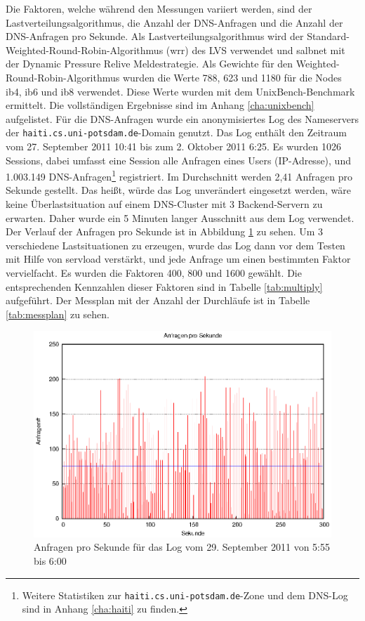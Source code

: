 \documentclass[a4paper, 12pt, BCOR10mm, DIV12, toc=bibliography, toc=listof, german]{scrbook}
\begin{document}
			Die Faktoren, welche während den Messungen variiert werden, sind der
			Lastverteilungsalgorithmus, die Anzahl der DNS-Anfragen und die Anzahl der DNS-Anfragen pro
			Sekunde. Als Lastverteilungsalgorithmus wird der Standard-Weighted-Round-Robin-Algorithmus
			(wrr) des LVS verwendet und salbnet mit der Dynamic Pressure Relive Meldestrategie. Als Gewichte
			für den Weighted-Round-Robin-Algorithmus wurden die Werte 788, 623 und 1180 für die Nodes ib4,
			ib6 und ib8 verwendet. Diese Werte wurden mit dem UnixBench-Benchmark \cite{unixbench}
			ermittelt. Die vollständigen Ergebnisse sind im Anhang \ref{cha:unixbench} aufgelistet. Für
			die DNS-Anfragen wurde ein anonymisiertes Log des Nameservers der
			\texttt{haiti.cs.uni-potsdam.de}-Domain genutzt. Das Log enthält den Zeitraum vom 27.
			September 2011 10:41 bis zum 2. Oktober 2011 6:25. Es wurden 1026 Sessions, dabei umfasst eine
			Session alle Anfragen eines Users (IP-Adresse), und 1.003.149 DNS-Anfragen\footnote{Weitere
			Statistiken zur \texttt{haiti.cs.uni-potsdam.de}-Zone und dem DNS-Log sind in Anhang
			\ref{cha:haiti} zu finden.} registriert. Im Durchschnitt werden 2,41 Anfragen pro Sekunde
			gestellt. Das heißt, würde das Log unverändert eingesetzt werden, wäre keine Überlastsituation
			auf einem DNS-Cluster mit 3 Backend-Servern zu erwarten. Daher wurde ein 5 Minuten langer
			Ausschnitt aus dem Log verwendet.  Der Verlauf der Anfragen pro Sekunde ist in Abbildung
			\ref{fig:requests} zu sehen. Um 3 verschiedene Lastsituationen zu erzeugen, wurde das Log
			dann vor dem Testen mit Hilfe von servload \cite{menski2012} verstärkt, und jede
			Anfrage um einen bestimmten Faktor vervielfacht. Es wurden die Faktoren 400, 800 und 1600
			gewählt. Die entsprechenden Kennzahlen dieser Faktoren sind in Tabelle \ref{tab:multiply}
			aufgeführt. Der Messplan mit der Anzahl der Durchläufe ist in Tabelle \ref{tab:messplan} zu
			sehen.


			\begin{figure}
				\centering
				\includegraphics[width=\textwidth]{plots/requests}
				\caption{Anfragen pro Sekunde für das Log vom 29. September 2011 von 5:55 bis 6:00}
				\label{fig:requests}
			\end{figure}
\end{document}

